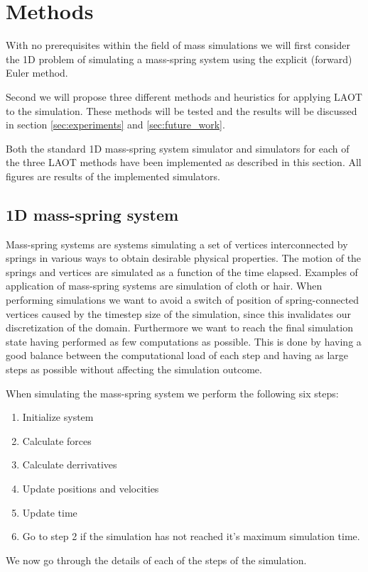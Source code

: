 \documentclass[11pt]{article}
\begin{document}

\section{Methods}
\label{sec:methods}
With no prerequisites within the field of mass simulations we will first
consider the 1D problem of simulating a mass-spring system using the explicit
(forward) Euler method.

Second we will propose three different methods and heuristics for applying
LAOT to the simulation. These methods will be tested and the results will be
discussed in section \ref{sec:experiments} and \ref{sec:future_work}.

Both the standard 1D mass-spring system simulator and simulators for each
of the three LAOT methods have been implemented as described in this section.
All figures are results of the implemented simulators.

\subsection{1D mass-spring system}
Mass-spring systems are systems simulating a set of vertices interconnected by
springs in various ways to obtain desirable physical properties. The motion
of the springs and vertices are simulated as a function of the time elapsed.
Examples of application of mass-spring systems are simulation of cloth or
hair. When performing simulations we want to avoid a switch of position of
spring-connected vertices caused by the timestep size of the simulation, since
this invalidates our discretization of the domain. Furthermore we want to reach
the final simulation state having performed as few computations as possible.
This is done by having a good balance between the computational load of each
step and having as large steps as possible without affecting the simulation
outcome.

When simulating the mass-spring system we perform the following six steps:
\begin{enumerate}
    \item Initialize system
    \item Calculate forces
    \item Calculate derrivatives
    \item Update positions and velocities
    \item Update time
    \item Go to step 2 if the simulation has not reached it's maximum
simulation time.
\end{enumerate}
We now go through the details of each of the steps of the simulation.
\end{document}
